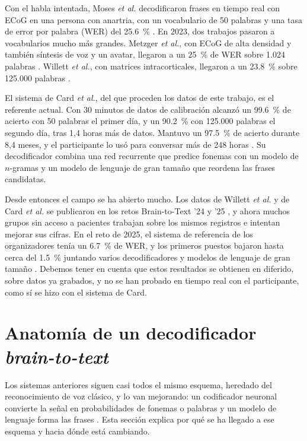 Con el habla intentada, Moses \textit{et al.} decodificaron frases en tiempo real con ECoG en una persona con anartria, con un vocabulario de 50 palabras y una tasa de error por palabra (WER) del \SI{25.6}{\percent} \cite{moses2021}. En 2023, dos trabajos pasaron a vocabularios mucho más grandes. Metzger \textit{et al.}, con ECoG de alta densidad y también síntesis de voz y un avatar, llegaron a un \SI{25}{\percent} de WER sobre 1.024 palabras \cite{metzger2023}. Willett \textit{et al.}, con matrices intracorticales, llegaron a un \SI{23.8}{\percent} sobre 125.000 palabras \cite{willett2023}.

El sistema de Card \textit{et al.}, del que proceden los datos de este trabajo, es el referente actual. Con 30 minutos de datos de calibración alcanzó un \SI{99.6}{\percent} de acierto con 50 palabras el primer día, y un \SI{90.2}{\percent} con 125.000 palabras el segundo día, tras 1,4 horas más de datos. Mantuvo un \SI{97.5}{\percent} de acierto durante 8,4 meses, y el participante lo usó para conversar más de 248 horas \cite{card2024}. Su decodificador combina una red recurrente que predice fonemas con un modelo de $n$-gramas y un modelo de lenguaje de gran tamaño que reordena las frases candidatas.

Desde entonces el campo se ha abierto mucho. Los datos de Willett \textit{et al.} y de Card \textit{et al.} se publicaron en los retos Brain-to-Text '24 y '25 \cite{b2t24lessons,b2t25}, y ahora muchos grupos sin acceso a pacientes trabajan sobre los mismos registros e intentan mejorar sus cifras. En el reto de 2025, el sistema de referencia de los organizadores tenía un \SI{6.7}{\percent} de WER, y los primeros puestos bajaron hasta cerca del \SI{1.5}{\percent} juntando varios decodificadores y modelos de lenguaje de gran tamaño \cite{b2t25}. Debemos tener en cuenta que estos resultados se obtienen en diferido, sobre datos ya grabados, y no se han probado en tiempo real con el participante, como sí se hizo con el sistema de Card.

\section{Anatomía de un decodificador \textit{brain-to-text}}
\label{sec:sota-anatomia}

Los sistemas anteriores siguen casi todos el mismo esquema, heredado del reconocimiento de voz clásico, y lo van mejorando: un codificador neuronal convierte la señal en probabilidades de fonemas o palabras y un modelo de lenguaje forma las frases \cite{crossspecies2025}. Esta sección explica por qué se ha llegado a ese esquema y hacia dónde está cambiando.

